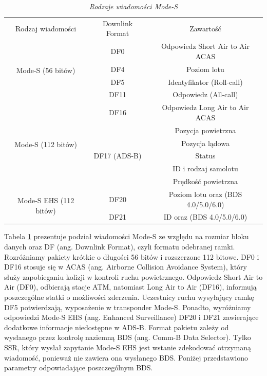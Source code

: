 \documentclass[eng,printmode]{mgr}
\begin{document}
\begin{table}[ph]
\caption{\textit{ Rodzaje wiadomości Mode-S}}
\label{tab:adsb}
  \centering
  \def\arraystretch{1.3}%
  \begin{tabular}{|c|c|c|}
  \hline
  \multicolumn{1}{|c|}{Rodzaj wiadomości} & \multicolumn{1}{c|}{Downlink Format} & \multicolumn{1}{c|}{Zawartość} \\\cline{1-3}
  \multirow{4}{*}{Mode-S (56 bitów)} 
  				 & \multicolumn{1}{c|}{DF0} & \multicolumn{1}{c|}{Odpowiedz Short Air to Air ACAS} \\\cline{2-3}
                 & \multicolumn{1}{c|}{DF4} & \multicolumn{1}{c|}{Poziom lotu} \\\cline{2-3}
                 & \multicolumn{1}{c|}{DF5} & \multicolumn{1}{c|}{Identyfikator (Roll-call)} \\\cline{2-3}
                 & \multicolumn{1}{c|}{DF11} & \multicolumn{1}{c|}{Odpowiedz (All-call)} \\\hline
  \multirow{6}{*}{Mode-S (112 bitów)} 
  				 & \multicolumn{1}{c|}{DF16} & \multicolumn{1}{c|}{Odpowiedz Long Air to Air ACAS} \\\cline{2-3}
                 & \multirow{5}{*}{DF17 (ADS-B)} & Pozycja powietrzna \\\hhline{~~~} 
                 &                       & Pozycja lądowa \\\hhline{~~~} 
                 &                       & Status \\\hhline{~~~} 
                 &                       & ID i rodzaj samolotu  \\\hhline{~~~} 
                 &                       & Prędkość powietrzna \\\hline
 \multirow{2}{*}{Mode-S EHS (112 bitów)} 
	& \multicolumn{1}{c|}{DF20} & \multicolumn{1}{c|}{Poziom lotu oraz (BDS 4.0/5.0/6.0)} \\\cline{2-3}
	& \multicolumn{1}{c|}{DF21} & \multicolumn{1}{c|}{ID oraz (BDS 4.0/5.0/6.0)} \\\hline
 \end{tabular}
\end{table}
\newpage

Tabela \ref{tab:adsb} prezentuje podział wiadomości Mode-S ze względu na rozmiar bloku danych oraz DF (ang. Downlink Format), czyli formatu odebranej ramki. Rozróżniamy pakiety krótkie o długości 56 bitów i rozszerzone 112 bitowe. DF0 i DF16 stosuje się w ACAS (ang. Airborne Collision Avoidance System), który służy zapobieganiu kolizji w kontroli ruchu powietrznego. Odpowiedz Short Air to Air (DF0), odbierają stacje ATM, natomiast Long Air to Air (DF16), informują poszczególne statki o możliwości zderzenia. Uczestnicy ruchu wysyłający ramkę DF5 potwierdzają, wyposażenie w transponder Mode-S. Ponadto, wyróżniamy odpowiedzi Mode-S EHS (ang. Enhanced Surveillance) DF20 i DF21 zawierające dodatkowe informacje niedostępne w ADS-B.
Format pakietu zależy od wysłanego przez kontrolę naziemną BDS (ang. Comm-B Data Selector).
Tylko SSR, który wysłał zapytanie Mode-S EHS jest wstanie zdekodować otrzymaną wiadomość, ponieważ nie zawiera ona wysłanego BDS. Poniżej przedstawiono parametry odpowiadające poszczególnym BDS.
\end{document}
